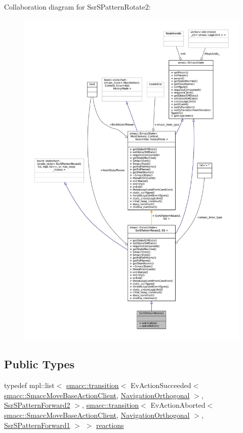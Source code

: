 Collaboration diagram for Ssr\+S\+Pattern\+Rotate2\+:
\nopagebreak
\begin{figure}[H]
\begin{center}
\leavevmode
\includegraphics[width=350pt]{structSsrSPatternRotate2__coll__graph}
\end{center}
\end{figure}
\subsection*{Public Types}
\begin{DoxyCompactItemize}
\item 
typedef mpl\+::list$<$ \hyperlink{classsmacc_1_1transition}{smacc\+::transition}$<$ Ev\+Action\+Succeeded$<$ \hyperlink{classsmacc_1_1SmaccMoveBaseActionClient}{smacc\+::\+Smacc\+Move\+Base\+Action\+Client}, \hyperlink{classNavigationOrthogonal}{Navigation\+Orthogonal} $>$, \hyperlink{structSsrSPatternForward2}{Ssr\+S\+Pattern\+Forward2} $>$, \hyperlink{classsmacc_1_1transition}{smacc\+::transition}$<$ Ev\+Action\+Aborted$<$ \hyperlink{classsmacc_1_1SmaccMoveBaseActionClient}{smacc\+::\+Smacc\+Move\+Base\+Action\+Client}, \hyperlink{classNavigationOrthogonal}{Navigation\+Orthogonal} $>$, \hyperlink{structSsrSPatternForward1}{Ssr\+S\+Pattern\+Forward1} $>$ $>$ \hyperlink{structSsrSPatternRotate2_a5cd0e154069c145a469384000c4aebd5}{reactions}
\end{DoxyCompactItemize}
